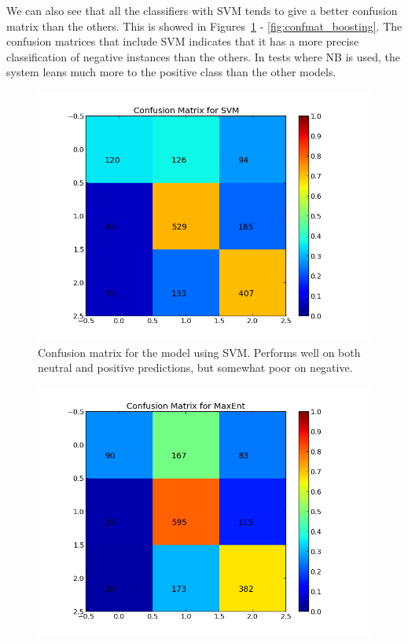 We can also see that all the classifiers with SVM tends to give a better confusion matrix than the others. This is showed in Figures~\ref{fig:confmat_svm} - \ref{fig:confmat_boosting}. The confusion matrices that include SVM indicates that it has a more precise classification of negative instances than the others. In tests where NB is used, the system leans much more to the positive class than the other models.

\begin{minipage}[!htb]{\linewidth}
     \centering
     \begin{minipage}{0.45\linewidth}
          \begin{figure}[H]
               \includegraphics[width=\linewidth]{../img/plots/grid/confusion_matrix_SVM.png}
           \caption[Plot showing the confusion matrix for SVM]{Confusion matrix for the model using SVM. Performs well on both neutral and positive predictions, but somewhat poor on negative.}
           \label{fig:confmat_svm}
          \end{figure}
     \end{minipage}
     \hspace{0.05\linewidth}
     \begin{minipage}{0.45\linewidth}
          \begin{figure}[H]
               \includegraphics[width=\linewidth]{../img/plots/grid/confusion_matrix_MaxEnt.png}

\end{figure}
\end{minipage}
\end{minipage}
